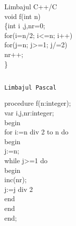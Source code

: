 Limbajul C++/C\\
void f(int n)\\
\{int i ,j,nr=0;\\
for(i=n/2; i<=n; i++)\\
for(j=n; j>=1; j/=2)\\
nr++;\\
\}

\begin{verbatim}

Limbajul Pascal
\end{verbatim}

procedure f(n:integer);\\
var i,j,nr:integer;\\
begin\\
for i:=n div 2 to n do\\
begin\\
j:=n;\\
while j>=1 do\\
begin\\
inc(nr);\\
j:=j div 2\\
end\\
end\\
end;

